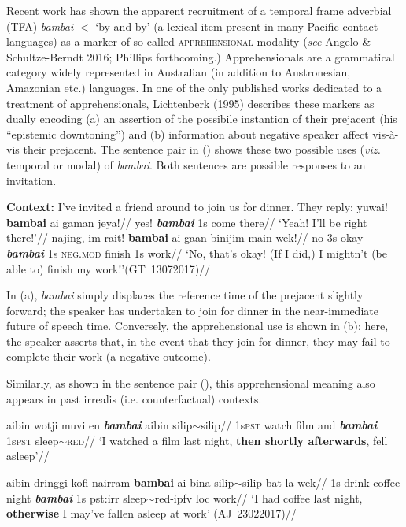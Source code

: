 \documentclass[12pt]{article}
\begin{document}
Recent work has shown the apparent recruitment of a temporal frame adverbial (TFA) \textit{bambai} $<$ `by-and-by' (a lexical item present in many Pacific contact languages) as a marker of so-called \textsc{apprehensional} modality (\textit{see} Angelo \& Schultze-Berndt 2016; Phillips forthcoming.) Apprehensionals are a grammatical category widely represented in Australian (in addition to Austronesian, Amazonian etc.) languages. In one of the only published works dedicated to a treatment of apprehensionals, Lichtenberk (1995) describes these markers as dually encoding (a) an assertion of the possibile instantion of their prejacent (his ``epistemic downtoning'') and (b) information about negative speaker affect vis-à-vis their prejacent. The sentence pair in (\nextx) shows these two possible uses (\textit{viz.} temporal or modal) of \textit{bambai}. Both sentences are possible responses to an invitation.

\pex\textbf{Context:} I've invited a friend around to join us for dinner. They reply:	
\a\begingl{}
\gla yuwai! \textbf{bambai} ai gaman jeya!//
\glb yes! \textit{\textbf{bambai}} 1s come there//
\glft `Yeah! I'll be right there!'//
\endgl
\a{}\begingl{}
\gla najing, im rait! \textbf{bambai} ai gaan binijim main wek!//
\glb no 3s okay \textit{\textbf{bambai}} 1s \textsc{neg.mod} finish 1s work//
\glft`No, that's okay! (If I did,) I mightn't (be able to) finish my work!'\hfill(GT~13072017)//
\endgl
	\xe

In (a), \textit{bambai} simply displaces the reference time of the prejacent slightly forward; the speaker has undertaken to join for dinner in the near-immediate future of speech time. Conversely, the apprehensional use is shown in (b); here, the speaker asserts that, in the event that they join for dinner, they may fail to complete their work (a negative outcome).

Similarly, as shown in the sentence pair (\nextx), this apprehensional meaning also appears in past irrealis (i.e. counterfactual) contexts.

\pex\a\begingl
\gla ai\textdblhyphen{}bin wotji muvi en \textbf{\textit{bambai}} aibin silip$\sim$silip//
\glb 1s\textdblhyphen\textsc{pst} watch film and \textit{\textbf{bambai}} 1s\textdblhyphen\textsc{pst} sleep$\sim$\textsc{red}//
\glft`I watched a film last night, \textbf{then shortly afterwards}, fell asleep'//\endgl

\a {}\begingl
\gla ai\textdblhyphen{}bin dringgi kofi nairram \textbf{bambai} ai bina silip$\sim$silip-bat la wek//
\glb 1s drink coffee night \textit{\textbf{bambai}} 1s {\sc pst:irr} sleep{\sc$\sim$red-ipfv} {\sc loc} work//
\glft`I had coffee last night, \textbf{otherwise} I may've fallen asleep at work' \hspace*{\fill}(AJ~23022017)//%
\endgl
\xe
\end{document}
